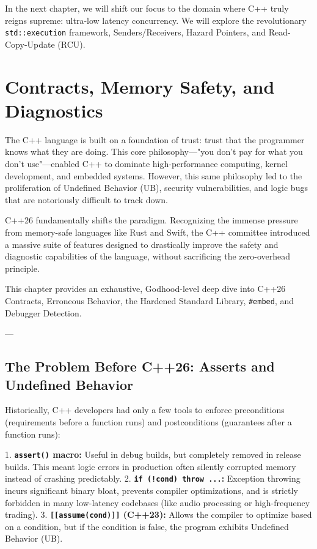 {{{{In the next chapter, we will shift our focus to the domain where C++ truly reigns supreme: ultra-low latency concurrency. We will explore the revolutionary \texttt{std::execution} framework, Senders/Receivers, Hazard Pointers, and Read-Copy-Update (RCU).
\chapter{Contracts, Memory Safety, and Diagnostics}

The C++ language is built on a foundation of trust: trust that the programmer knows what they are doing. This core philosophy—"you don't pay for what you don't use"—enabled C++ to dominate high-performance computing, kernel development, and embedded systems. However, this same philosophy led to the proliferation of Undefined Behavior (UB), security vulnerabilities, and logic bugs that are notoriously difficult to track down.

C++26 fundamentally shifts the paradigm. Recognizing the immense pressure from memory-safe languages like Rust and Swift, the C++ committee introduced a massive suite of features designed to drastically improve the safety and diagnostic capabilities of the language, without sacrificing the zero-overhead principle.

This chapter provides an exhaustive, Godhood-level deep dive into C++26 Contracts, Erroneous Behavior, the Hardened Standard Library, \texttt{#embed}, and Debugger Detection.

---

\section{The Problem Before C++26: Asserts and Undefined Behavior}

Historically, C++ developers had only a few tools to enforce preconditions (requirements before a function runs) and postconditions (guarantees after a function runs):

1. \textbf{\texttt{assert()} macro:} Useful in debug builds, but completely removed in release builds. This meant logic errors in production often silently corrupted memory instead of crashing predictably.
2. \textbf{\texttt{if (!cond) throw ...}:} Exception throwing incurs significant binary bloat, prevents compiler optimizations, and is strictly forbidden in many low-latency codebases (like audio processing or high-frequency trading).
3. \textbf{\texttt{[[assume(cond)]]} (C++23):} Allows the compiler to optimize based on a condition, but if the condition is false, the program exhibits Undefined Behavior (UB).

}}}}
